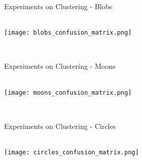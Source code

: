 \begin{frame}{Experiments on Clustering - Blobs}
    \begin{minipage}{.49\textwidth}
        \centering
        \setlength\figureheight{.65\textheight}
        \setlength{}
        
        \\
        \texttt{[image: blobs\_confusion\_matrix.png]}
    \end{minipage}
    \begin{minipage}{.49\textwidth}
        \centering
        \setlength\figureheight{.65\textheight}
        \setlength{}
        
        \\
        \hfill{}
    \end{minipage}
\end{frame}


\begin{frame}{Experiments on Clustering - Moons}
    \begin{minipage}{.49\textwidth}
        \centering
        \setlength\figureheight{.65\textheight}
        \setlength{}
        
        \\
        \texttt{[image: moons\_confusion\_matrix.png]}
    \end{minipage}
    \begin{minipage}{.49\textwidth}
        \centering
        \setlength\figureheight{.65\textheight}
        \setlength{}
        
        \\
        \hfill{}
    \end{minipage}
\end{frame}

\begin{frame}{Experiments on Clustering - Circles}
    \begin{minipage}{.49\textwidth}
        \centering
        \setlength\figureheight{.65\textheight}
        \setlength{}
        
        \\
        \texttt{[image: circles\_confusion\_matrix.png]}
    \end{minipage}
    \begin{minipage}{.49\textwidth}
        \centering
        \setlength\figureheight{.65\textheight}
        \setlength{}
        
        \\
        \hfill{}
    \end{minipage}
\end{frame}
